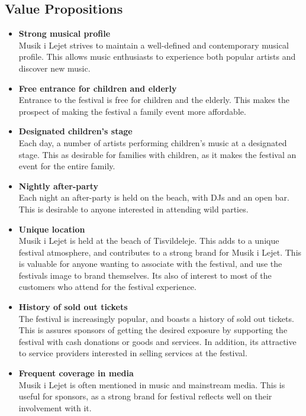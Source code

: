 \subsection{Value Propositions} %
\label{sub:value_propositions}
\begin{itemize}
	\item \textbf{Strong musical profile}\\
	 Musik i Lejet strives to maintain a well-defined and contemporary musical profile. This allows music enthusiasts to experience both popular artists and discover new music.
	\item \textbf{Free entrance for children and elderly}\\
	Entrance to the festival is free for children and the elderly. This makes the prospect of making the festival a family event more affordable.
	\item \textbf{Designated children's stage}\\
	Each day, a number of artists performing children's music at a designated stage. This as desirable for families with children, as it makes the festival an event for the entire family.
	\item \textbf{Nightly after-party}\\
	Each night an after-party is held on the beach, with DJs and an open bar. This is desirable to anyone interested in attending wild parties.
	\item \textbf{Unique location}\\
	Musik i Lejet is held at the beach of Tisvildeleje. This adds to a unique festival atmosphere, and contributes to a strong brand for Musik i Lejet. This is valuable for anyone wanting to associate with the festival, and use the festivals image to brand themselves. Its also of interest to most of the customers who attend for the festival experience.
	\item \textbf{History of sold out tickets}\\
	The festival is increasingly popular, and boasts a history of sold out tickets. This is assures sponsors of getting the desired exposure by supporting the festival with cash donations or goods and services. In addition, its attractive to service providers interested in selling services at the festival.
	\item \textbf{Frequent coverage in media}\\
	Musik i Lejet is often mentioned in music and mainstream media. This is useful for sponsors, as a strong brand for festival reflects well on their involvement with it.
\end{itemize}
